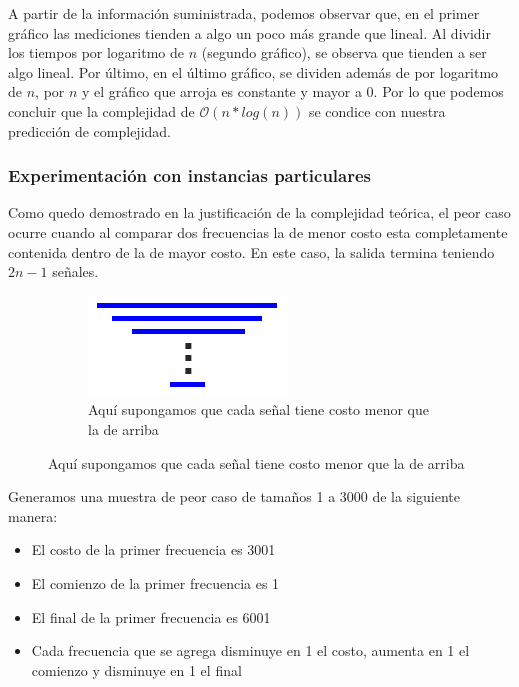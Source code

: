 A partir de la información suministrada, podemos observar que, en el primer gráfico las mediciones tienden a algo un poco más grande que lineal. Al dividir los tiempos por logaritmo de $n$ (segundo gráfico), se observa que tienden a ser algo lineal. Por último, en el último gráfico, se dividen además de por logaritmo de $n$, por $n$ y el gráfico que arroja es constante y mayor a 0. Por lo que podemos concluir que la complejidad de $\mathcal{O}(n*log(n))$ se condice con nuestra predicción de complejidad.

\subsubsection{Experimentación con instancias particulares}


Como quedo demostrado en la justificación de la complejidad teórica, el peor caso ocurre cuando al comparar dos frecuencias la de menor costo esta completamente contenida dentro de la de mayor costo. En este caso, la salida termina teniendo $2n-1$ señales. \\

\begin{figure}[H]
        		\centering
				\begin{subfigure}[b]{0.25\textwidth}
                	\includegraphics[width=\textwidth]{imagenes/ej2-wc-dibujo.jpg}
                	\caption{Aquí supongamos que cada señal tiene costo menor que la de arriba}
        		\end{subfigure}%
			\end{figure}

Generamos una muestra de peor caso de tamaños 1 a 3000 de la siguiente manera:
\begin{itemize}
	\item El costo de la primer frecuencia es 3001
	\item El comienzo de la primer frecuencia es 1
    \item El final de la primer frecuencia es 6001
    \item Cada frecuencia que se agrega disminuye en 1 el costo, aumenta en 1 el comienzo y disminuye en 1 el final
\end{itemize}



